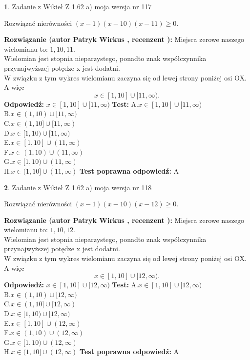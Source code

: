 \documentclass[12pt, a4paper]{article}
\theoremstyle{definition} %
\newtheorem{zad}{}
\newcommand{\zadStart}[1]{\begin{zad}#1\newline}
\newcommand{\zadStop}{\end{zad}}
\newcommand{\rozwStart}[2]{\noindent \textbf{Rozwiązanie (autor #1 , recenzent #2): }\newline}
\newcommand{\rozwStop}{\newline}
\newcommand{\odpStart}{\noindent \textbf{Odpowiedź:}\newline}
\newcommand{\odpStop}{\newline}
\newcommand{\testStart}{\noindent \textbf{Test:}\newline}
\newcommand{\testStop}{\newline}
\newcommand{\kluczStart}{\noindent \textbf{Test poprawna odpowiedź:}\newline}
\newcommand{\kluczStop}{\newline}
\begin{document}
\zadStart{Zadanie z Wikieł Z 1.62 a) moja wersja nr 117}

Rozwiązać nierówności $(x-1)(x-10)(x-11)\ge0$.
\zadStop
\rozwStart{Patryk Wirkus}{}
Miejsca zerowe naszego wielomianu to: $1, 10, 11$.\\
Wielomian jest stopnia nieparzystego, ponadto znak współczynnika przy\linebreak najwyższej potędze x jest dodatni.\\ W związku z tym wykres wielomianu zaczyna się od lewej strony poniżej osi OX. A więc $$x \in [1,10] \cup [11,\infty).$$
\rozwStop
\odpStart
$x \in [1,10] \cup [11,\infty)$
\odpStop
\testStart
A.$x \in [1,10] \cup [11,\infty)$\\
B.$x \in (1,10) \cup [11,\infty)$\\
C.$x \in (1,10] \cup [11,\infty)$\\
D.$x \in [1,10) \cup [11,\infty)$\\
E.$x \in [1,10] \cup (11,\infty)$\\
F.$x \in (1,10) \cup (11,\infty)$\\
G.$x \in [1,10) \cup (11,\infty)$\\
H.$x \in (1,10] \cup (11,\infty)$
\testStop
\kluczStart
A
\kluczStop



\zadStart{Zadanie z Wikieł Z 1.62 a) moja wersja nr 118}

Rozwiązać nierówności $(x-1)(x-10)(x-12)\ge0$.
\zadStop
\rozwStart{Patryk Wirkus}{}
Miejsca zerowe naszego wielomianu to: $1, 10, 12$.\\
Wielomian jest stopnia nieparzystego, ponadto znak współczynnika przy\linebreak najwyższej potędze x jest dodatni.\\ W związku z tym wykres wielomianu zaczyna się od lewej strony poniżej osi OX. A więc $$x \in [1,10] \cup [12,\infty).$$
\rozwStop
\odpStart
$x \in [1,10] \cup [12,\infty)$
\odpStop
\testStart
A.$x \in [1,10] \cup [12,\infty)$\\
B.$x \in (1,10) \cup [12,\infty)$\\
C.$x \in (1,10] \cup [12,\infty)$\\
D.$x \in [1,10) \cup [12,\infty)$\\
E.$x \in [1,10] \cup (12,\infty)$\\
F.$x \in (1,10) \cup (12,\infty)$\\
G.$x \in [1,10) \cup (12,\infty)$\\
H.$x \in (1,10] \cup (12,\infty)$
\testStop
\kluczStart
A
\kluczStop
\end{document}

